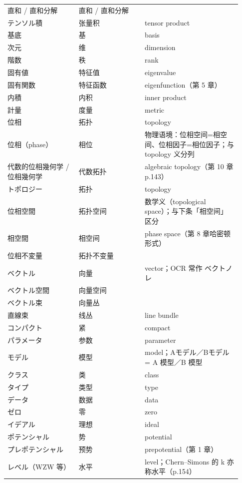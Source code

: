 \begin{longtable}{@{}>{\raggedright\arraybackslash}p{0.29\linewidth}>{\raggedright\arraybackslash}p{0.26\linewidth}>{\raggedright\arraybackslash}p{0.38\linewidth}@{}}
直和 / 直和分解 & \mbox{直和} / \mbox{直和分解} &  \\
テンソル積 & \mbox{张量积} & tensor product \\
基底 & \mbox{基} & basis \\
次元 & \mbox{维} & dimension \\
階数 & \mbox{秩} & rank \\
固有値 & \mbox{特征值} & eigenvalue \\
固有関数 & \mbox{特征函数} & eigenfunction（第 5 章） \\
内積 & \mbox{内积} & inner product \\
計量 & \mbox{度量} & metric \\
位相 & \mbox{拓扑} & topology \\
位相（phase） & \mbox{相位} & 物理语境：位相空间=相空间、位相因子=相位因子；与 topology 义分列 \\
代数的位相幾何学 / 位相幾何学 & \mbox{代数拓扑} & algebraic topology（第 10 章 p.143） \\
トポロジー & \mbox{拓扑} & topology \\
位相空間 & \mbox{拓扑空间} & 数学义（topological space）；与下条「相空间」区分 \\
相空間 & \mbox{相空间} & phase space（第 8 章哈密顿形式） \\
位相不変量 & \mbox{拓扑不变量} &  \\
ベクトル & \mbox{向量} & vector；OCR 常作 ベクトノレ \\
ベクトル空間 & \mbox{向量空间} &  \\
ベクトル束 & \mbox{向量丛} &  \\
直線束 & \mbox{线丛} & line bundle \\
コンパクト & \mbox{紧} & compact \\
パラメータ & \mbox{参数} & parameter \\
モデル & \mbox{模型} & model；Aモデル／Bモデル = A 模型／B 模型 \\
クラス & \mbox{类} & class \\
タイプ & \mbox{类型} & type \\
データ & \mbox{数据} & data \\
ゼロ & \mbox{零} & zero \\
イデアル & \mbox{理想} & ideal \\
ポテンシャル & \mbox{势} & potential \\
プレポテンシャル & \mbox{预势} & prepotential（第 1 章） \\
レベル（WZW 等） & \mbox{水平} & level；Chern--Simons 的 k 亦称水平（p.154） \\

\end{longtable}
